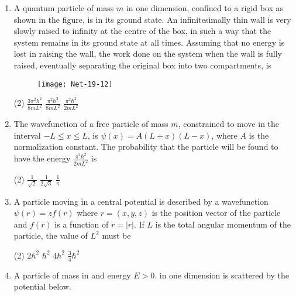 \begin{enumerate}
\begin{tasks}
	\task[\textbf{a.}]Increases by a team of order $\varepsilon$
	\task[\textbf{b.}] Decreases by a term of order $\varepsilon$
	\task[\textbf{c.}]Increases by a term of order $\varepsilon^{2}$
	\task[\textbf{d.}]  Decreases by a term of order $\varepsilon^{2}$
\end{tasks}
\item  A quantum particle of mass $m$ in one dimension, confined to a rigid box as shown in the figure, is in its ground state. An infinitesimally thin wall is very slowly raised to infinity at the centre of the box, in such a way that the system remains in its ground state at all times. Assuming that no energy is lost in raising the wall, the work done on the system when the wall is fully raised, eventually separating the original box into two compartments, is
\begin{figure}[H]
	\centering
	\texttt{[image: Net-19-12]}
\end{figure}
 \begin{tasks}(2)
	\task[\textbf{a.}]$\frac{3 \pi^{2} \hbar^{2}}{8 m L^{2}}$
	\task[\textbf{b.}]$\frac{\pi^{2} \hbar^{2}}{8 m L^{2}}$
	\task[\textbf{c.}] $\frac{\pi^{2} \hbar^{2}}{2 m L^{2}}$
\end{tasks}
\item  The wavefunction of a free particle of mass $m$, constrained to move in the interval $-L \leq x \leq L$, is $\psi(x)=A(L+x)(L-x)$, where $A$ is the normalization constant. The probability that the particle will be found to have the energy $\frac{\pi^{2} \hbar^{2}}{2 m L^{2}}$ is
 \begin{tasks}(2)
	\task[\textbf{b.}]$\frac{1}{\sqrt{2}}$
	\task[\textbf{c.}]$\frac{1}{2 \sqrt{3}}$
	\task[\textbf{d.}] $\frac{1}{\pi}$ 
\end{tasks}
\item  A particle moving in a central potential is described by a wavefunction $\psi(r)=z f(r)$ where $r=(x, y, z)$ is the position vector of the particle and $f(r)$ is a function of $r=|r|$.
If $L$ is the total angular momentum of the particle, the value of $L^{2}$ must be
 \begin{tasks}(2)
	\task[\textbf{a.}]$2 \hbar^{2}$
	\task[\textbf{b.}]$\hbar^{2}$
	\task[\textbf{c.}]$4 \hbar^{2}$
	\task[\textbf{d.}]$\frac{3}{4} \hbar^{2}$ 
\end{tasks}
\item  A particle of mass in and energy $E>0$. in one dimension is scattered by the potential below.
\begin{figure}[H]

\end{figure}
\end{enumerate}
